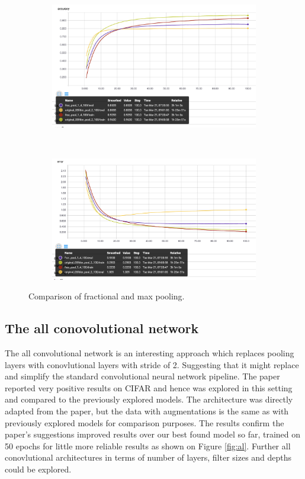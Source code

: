 \documentclass[12pt]{article}
\begin{document}
\begin{figure}[ht!]
    \centering
    \begin{subfigure}[t]{0.475\textwidth}
        \centering
        \includegraphics[width=1.0\linewidth]{disfraca.png}
    \end{subfigure}%
    ~ 
    \begin{subfigure}[t]{0.475\textwidth}
        \centering
        \includegraphics[width=1.0\linewidth]{disfrace.png}
    \end{subfigure}
    \caption{Comparison of fractional and max pooling.}
    \label{fig:fraccomp}
\end{figure}

\subsection*{The all conovolutional network}

The all convolutional network\cite{allconv} is an interesting approach which replaces pooling layers with conovlutional layers with stride of 2. Suggesting that it might replace and simplify the standard convolutional neural network pipeline\cite{stan}. The paper reported very positive results on CIFAR and hence was explored in this setting and compared to the previously explored models. The architecture was directly adapted from the paper, but the data with augmentations is the same as with previously explored models for comparison purposes. The results confirm the paper's suggestions improved results over our best found model so far, trained on 50 epochs for little more reliable results as shown on Figure \ref{fig:al}. Further all conovlutional architectures in terms of number of layers, filter sizes and depths could be explored. 
\end{document}
